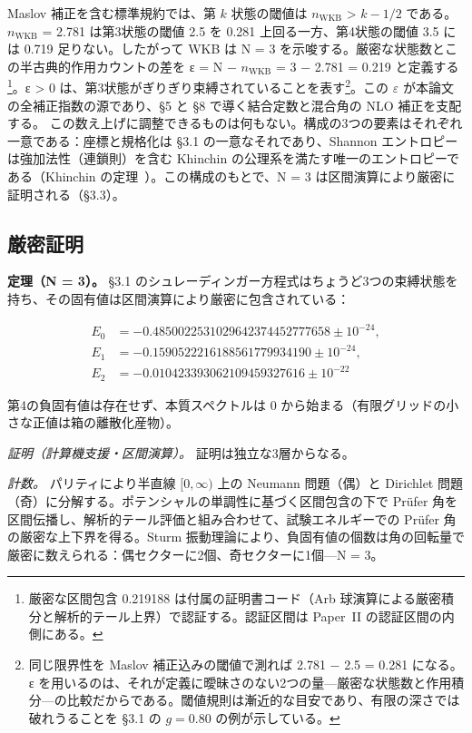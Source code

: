 \documentclass[fontsize=11pt,paper=a4,lualatex]{jlreq}
\begin{document}
Maslov 補正を含む標準規約では、第 $k$ 状態の閾値は $n_{\mathrm{WKB}}$ \textgreater{} $k - 1/2$ である。$n_{\mathrm{WKB}}$ = 2.781 は第3状態の閾値 2.5 を 0.281 上回る一方、第4状態の閾値 3.5 には 0.719 足りない。したがって WKB は N = 3 を示唆する。厳密な状態数とこの半古典的作用カウントの差を ε = N − $n_{\mathrm{WKB}}$ = 3 − 2.781 = 0.219 と定義する\footnote{厳密な区間包含 0.219188 は付属の証明書コード（Arb 球演算による厳密積分と解析的テール上界）で認証する。認証区間は Paper~II の認証区間の内側にある。}。ε \textgreater{} 0 は、第3状態がぎりぎり束縛されていることを表す\footnote{同じ限界性を Maslov 補正込みの閾値で測れば 2.781 − 2.5 = 0.281 になる。ε を用いるのは、それが定義に曖昧さのない2つの量---厳密な状態数と作用積分---の比較だからである。閾値規則は漸近的な目安であり、有限の深さでは破れうることを §3.1 の $g = 0.80$ の例が示している。}。この $\varepsilon$ が本論文の全補正指数の源であり、§5 と §8 で導く結合定数と混合角の NLO 補正を支配する。
この数え上げに調整できるものは何もない。構成の3つの要素はそれぞれ一意である：座標と規格化は §3.1 の一意なそれであり、Shannon エントロピーは強加法性（連鎖則）を含む Khinchin の公理系を満たす唯一のエントロピーである（Khinchin の定理~\cite{aczel,khinchin}）。この構成のもとで、N = 3 は区間演算により厳密に証明される（§3.3）。

\subsection{厳密証明}\label{ux53b3ux5bc6ux8a3cux660e}

\textbf{定理（N = 3）。} §3.1 のシュレーディンガー方程式はちょうど3つの束縛状態を持ち、その固有値は区間演算により厳密に包含されている：

\[
\begin{aligned}
E_0 &= -0.4850022531029642374452777658 \pm 10^{-24},\\
E_1 &= -0.1590522216188561779934190 \pm 10^{-24},\\
E_2 &= -0.010423393062109459327616 \pm 10^{-22}
\end{aligned}
\]

第4の負固有値は存在せず、本質スペクトルは 0 から始まる（有限グリッドの小さな正値は箱の離散化産物）。

\emph{証明（計算機支援・区間演算）。} 証明は独立な3層からなる。

\emph{計数。} パリティにより半直線 $[0,\infty)$ 上の Neumann 問題（偶）と Dirichlet 問題（奇）に分解する。ポテンシャルの単調性に基づく区間包含の下で Prüfer 角を区間伝播し、解析的テール評価と組み合わせて、試験エネルギーでの Prüfer 角の厳密な上下界を得る。Sturm 振動理論により、負固有値の個数は角の回転量で厳密に数えられる：偶セクターに2個、奇セクターに1個---N = 3。
\end{document}
